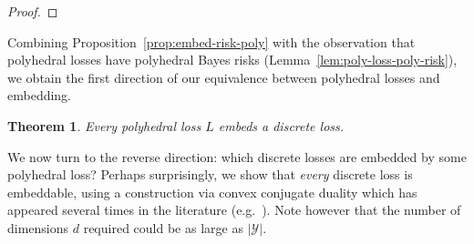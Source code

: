 \documentclass[12pt]{article}
\newcommand{\Comments}{1}
\newcommand{\mytodo}[2]{\ifnum\Comments=1%
  \todo[linecolor=#1!80!black,backgroundcolor=#1,bordercolor=#1!80!black]{#2}\fi}
\newcommand{\raft}[1]{\mytodo{green!20!white}{RF: #1}}
\newcommand{\prop}[1]{\mathrm{prop}[#1]}
\newcommand{\simplex}{\Delta_\Y}
\newcommand{\U}{\mathcal{U}}
\newcommand{\Y}{\mathcal{Y}}
\newcommand{\risk}[1]{\underline{#1}}
\newcommand{\inter}[1]{\mathring{#1}}%
\DeclareMathOperator*{\argmin}{arg\,min}
\newtheorem{theorem}{Theorem}
\begin{document}
\begin{proof}
\end{proof}

Combining Proposition~\ref{prop:embed-risk-poly} with the observation that polyhedral losses have polyhedral Bayes risks (Lemma~\ref{lem:poly-loss-poly-risk}), we obtain the first direction of our equivalence between polyhedral losses and embedding.

\begin{theorem}\label{thm:poly-embeds-discrete}
  Every polyhedral loss $L$ embeds a discrete loss.
\end{theorem}

We now turn to the reverse direction: which discrete losses are embedded by some polyhedral loss?
Perhaps surprisingly, we show that \emph{every} discrete loss is embeddable,
using a construction via convex conjugate duality which has appeared several times in the literature (e.g.\ \cite{duchi2018multiclass,abernethy2013efficient,frongillo2014general}).
Note however that the number of dimensions $d$ required could be as large as $|\Y|$.
\end{document}

